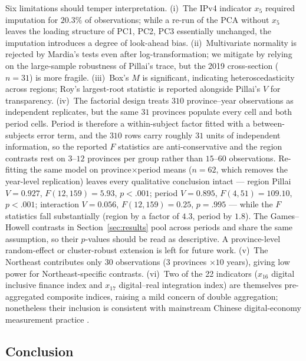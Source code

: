 \documentclass[12pt,letterpaper]{article}
\begin{document}
Six limitations should temper interpretation.  (i)~The IPv4 indicator $x_5$
required imputation for $20.3\%$ of observations; while a re-run of the PCA
without $x_5$ leaves the loading structure of PC1, PC2, PC3 essentially
unchanged, the imputation introduces a degree of look-ahead bias.
(ii)~Multivariate normality is rejected by Mardia's tests even after
log-transformation; we mitigate by relying on the large-sample robustness of
Pillai's trace, but the 2019 cross-section ($n=31$) is more fragile.
(iii)~Box's $M$ is significant, indicating heteroscedasticity across regions;
Roy's largest-root statistic is reported alongside Pillai's $V$ for
transparency.  (iv)~The factorial design treats $310$ province--year observations as independent
replicates, but the same $31$ provinces populate every cell and both period
cells.  Period is therefore a within-subject factor fitted with a
between-subjects error term, and the $310$ rows carry roughly $31$ units of
independent information, so the reported $F$ statistics are anti-conservative
and the region contrasts rest on $3$--$12$ provinces per group rather than
$15$--$60$ observations.  Re-fitting the same model on province$\times$period
means ($n=62$, which removes the year-level replication) leaves every
qualitative conclusion intact --- region Pillai $V=0.927$, $F(12,159)=5.93$,
$p<.001$; period $V=0.895$, $F(4,51)=109.10$, $p<.001$; interaction
$V=0.056$, $F(12,159)=0.25$, $p=.995$ --- while the $F$ statistics fall
substantially (region by a factor of $4.3$, period by $1.8$).  The
Games--Howell contrasts in Section~\ref{sec:results} pool across periods and
share the same assumption, so their $p$-values should be read as descriptive.
A province-level random-effect or cluster-robust extension is left for future
work.
(v)~The Northeast contributes only $30$ observations ($3$ provinces $\times 10$
years), giving low power for Northeast-specific contrasts.
(vi)~Two of the 22 indicators ($x_{16}$ digital inclusive finance index and
$x_{17}$ digital--real integration index) are themselves pre-aggregated
composite indices, raising a mild concern of double aggregation; nonetheless
their inclusion is consistent with mainstream Chinese digital-economy
measurement practice \citep{he2023,he2024}.

\subsection{Conclusion}
\end{document}
